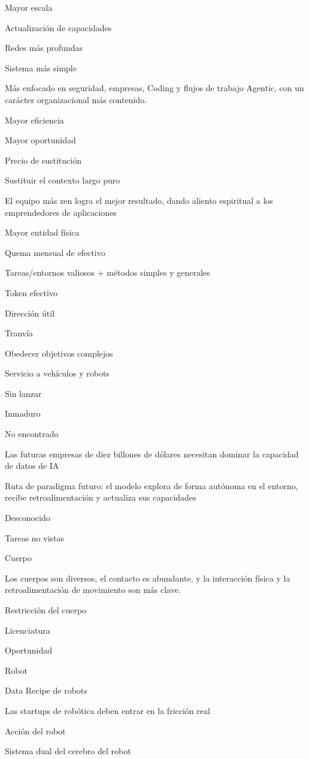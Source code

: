 \documentclass{article}
\begin{document}
Mayor escala

Actualización de capacidades

Redes más profundas

Sistema más simple

Más enfocado en seguridad, empresas, Coding y flujos de trabajo Agentic, con un carácter organizacional más contenido.

Mayor eficiencia

Mayor oportunidad

Precio de sustitución

Sustituir el contexto largo puro

El equipo más zen logra el mejor resultado, dando aliento espiritual a los emprendedores de aplicaciones

Mayor entidad física

Quema mensual de efectivo

Tareas/entornos valiosos + métodos simples y generales

Token efectivo

Dirección útil

Tranvía

Obedecer objetivos complejos

Servicio a vehículos y robots

Sin lanzar

Inmaduro

No encontrado

Las futuras empresas de diez billones de dólares necesitan dominar la capacidad de datos de IA

Ruta de paradigma futuro: el modelo explora de forma autónoma en el entorno, recibe retroalimentación y actualiza sus capacidades

Desconocido

Tareas no vistas

Cuerpo

Los cuerpos son diversos, el contacto es abundante, y la interacción física y la retroalimentación de movimiento son más clave.

Restricción del cuerpo

Licenciatura

Oportunidad

Robot

Data Recipe de robots

Las startups de robótica deben entrar en la fricción real

Acción del robot

Sistema dual del cerebro del robot
\end{document}
